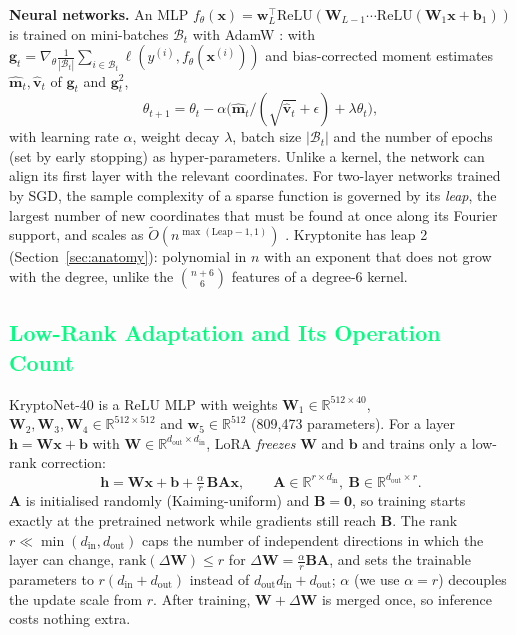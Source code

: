 \documentclass{article}
\newcommand{\csubsection}[1]{\subsection{\textcolor{springgreen}{#1}}}
\theoremstyle{plain}
\newcommand{\R}{\mathbb{R}}
\newcommand{\bx}{\mathbf{x}}
\newcommand{\bw}{\mathbf{w}}
\newcommand{\W}{\mathbf{W}}
\newcommand{\A}{\mathbf{A}}
\newcommand{\B}{\mathbf{B}}
\newcommand{\din}{d_{\mathrm{in}}}
\newcommand{\dout}{d_{\mathrm{out}}}
\begin{document}
\textbf{Neural networks.} An MLP $f_\theta(\bx)=\bw_L^\top\mathrm{ReLU}(\W_{L-1}\cdots\mathrm{ReLU}(\W_1\bx+\mathbf{b}_1))$ is trained on mini-batches $\mathcal B_t$ with AdamW \citep{kingma2015adam,loshchilov2019decoupled}: with $\mathbf g_t=\nabla_\theta\frac1{|\mathcal B_t|}\sum_{i\in\mathcal B_t}\ell(y^{(i)},f_\theta(\bx^{(i)}))$ and bias-corrected moment estimates $\hat{\mathbf m}_t,\hat{\mathbf v}_t$ of $\mathbf g_t$ and $\mathbf g_t^2$,
\begin{equation}
\theta_{t+1}=\theta_t-\alpha\bigl(\hat{\mathbf m}_t/(\sqrt{\hat{\mathbf v}_t}+\epsilon)+\lambda\theta_t\bigr),
\label{eq:adam}
\end{equation}
with learning rate $\alpha$, weight decay $\lambda$, batch size $|\mathcal B_t|$ and the number of epochs (set by early stopping) as hyper-parameters. Unlike a kernel, the network can align its first layer with the relevant coordinates. For two-layer networks trained by SGD, the sample complexity of a sparse function is governed by its \emph{leap}, the largest number of new coordinates that must be found at once along its Fourier support, and scales as $\tilde O(n^{\max(\mathrm{Leap}-1,1)})$ \citep{abbe2022merged,abbe2023leap}. Kryptonite has leap 2 (Section~\ref{sec:anatomy}): polynomial in $n$ with an exponent that does not grow with the degree, unlike the $\binom{n+6}{6}$ features of a degree-6 kernel.


\begin{table}[t]
\caption{Test accuracy (\%) on Kryptonite-$n$: mean $\pm$ 95\% CI over the same 5 splits for every model; bold: above the 90\% target. ``Representation'' states how the model's input representation is obtained. Time: seconds per fit at $n=40$ on two CPU cores, including hyper-parameter search.}
\label{tab:models}
\vskip 0.05in
\begin{center}

\end{center}
\vskip -0.2in
\end{table}

\csubsection{Low-Rank Adaptation and Its Operation Count}
\label{sec:lora}
KryptoNet-40 is a ReLU MLP with weights $\W_1\in\R^{512\times40}$, $\W_2,\W_3,\W_4\in\R^{512\times512}$ and $\bw_5\in\R^{512}$ (809,473 parameters). For a layer $\mathbf h=\W\bx+\mathbf b$ with $\W\in\R^{\dout\times\din}$, LoRA \citep{hu2022lora} \emph{freezes} $\W$ and $\mathbf b$ and trains only a low-rank correction:
\begin{equation}
\mathbf h=\W\bx+\mathbf b+\tfrac{\alpha}{r}\,\B\A\bx,\qquad \A\in\R^{r\times\din},\ \B\in\R^{\dout\times r}.
\label{eq:lora}
\end{equation}
$\A$ is initialised randomly (Kaiming-uniform) and $\B=\mathbf 0$, so training starts exactly at the pretrained network while gradients still reach $\B$. The rank $r\ll\min(\din,\dout)$ caps the number of independent directions in which the layer can change, $\mathrm{rank}(\Delta\W)\le r$ for $\Delta\W=\frac\alpha r\B\A$, and sets the trainable parameters to $r(\din+\dout)$ instead of $\dout\din+\dout$; $\alpha$ (we use $\alpha=r$) decouples the update scale from $r$. After training, $\W+\Delta\W$ is merged once, so inference costs nothing extra.
\end{document}
